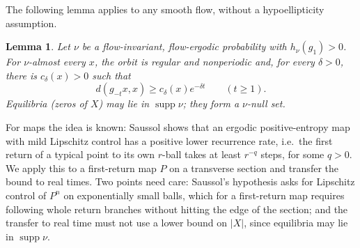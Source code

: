 \documentclass[11pt]{article}
\newtheorem{lemma}[theorem]{Lemma}
\theoremstyle{remark}
\newcommand{\supp}{\operatorname{supp}}
\begin{document}
The following lemma applies to any smooth flow, without a
hypoellipticity assumption.

\begin{lemma}\label{lem:nonrecurrence}
Let \(\nu\) be a flow-invariant, flow-ergodic probability with
\(h_\nu(g_1)>0\).  For \(\nu\)-almost every \(x\), the orbit is regular
and nonperiodic and, for every \(\delta>0\), there is \(c_\delta(x)>0\)
such that
\begin{equation}\label{eq:nonrecurrence}
 d(g_{-t}x,x)\ge c_\delta(x)e^{-\delta t}\qquad(t\ge1).
\end{equation}
Equilibria (zeros of \(X\)) may lie in \(\supp\nu\); they form a
\(\nu\)-null set.
\end{lemma}


For maps the idea is known: Saussol \cite{Saussol2004} shows
that an ergodic positive-entropy map with mild Lipschitz control has a
positive lower recurrence rate, i.e.\ the first return of a typical
point to its own \(r\)-ball takes at least \(r^{-q}\) steps, for
some \(q>0\).  We
apply this to a first-return map \(P\) on a transverse section and
transfer the bound to real times.  Two points need
care: Saussol's hypothesis asks for Lipschitz control of \(P^n\) on
exponentially small balls, which for a first-return map requires
following whole return branches without hitting the edge of the
section; and the transfer to real time must not use a lower bound
on \(|X|\), since equilibria may lie in \(\supp\nu\).
\end{document}
